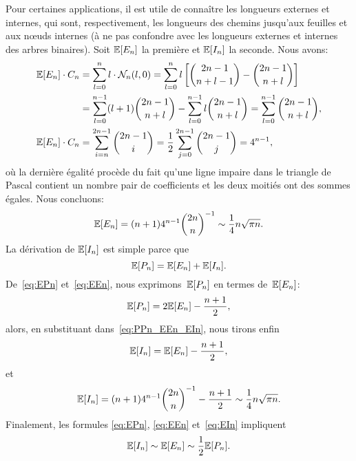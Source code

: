 Pour certaines applications, il est utile de connaître les longueurs
externes et internes, qui sont, respectivement, les longueurs des
chemins jusqu'aux feuilles et aux n{\oe}uds internes (à ne pas
confondre avec les longueurs externes et internes des arbres
binaires). Soit \(\mathbb{E}[{E_n}]\) la première et \(\mathbb{E}[{I_n}]\)
la seconde. Nous avons:
\begin{align*}
\mathbb{E}[{E_n}] \cdot C_n
  &= \sum_{l=0}^{n} l \cdot \mathcal{N}_n(l,0)
   = \sum_{l=0}^{n}l\left[\binom{2n-1}{n+l-1} -
     \binom{2n-1}{n+l}\right]\\
  &= \sum_{l=0}^{n-1}(l+1)\binom{2n-1}{n+l} -
     \sum_{l=0}^{n-1}l \binom{2n-1}{n+l}
   = \sum_{l=0}^{n-1}\binom{2n-1}{n+l},\\
\mathbb{E}[{E_n}] \cdot C_n
  &= \sum_{i=n}^{2n-1}\binom{2n-1}{i}
   = \frac{1}{2}\sum_{j=0}^{2n-1}\binom{2n-1}{j} = 4^{n-1},
\end{align*}
où la dernière égalité procède du fait qu'une ligne impaire dans le
triangle de Pascal contient un nombre pair de coefficients et les deux
moitiés ont des sommes égales. Nous concluons:
\begin{equation}
\mathbb{E}[{E_n}] = (n+1) 4^{n-1}\binom{2n}{n}^{-1} \sim
\frac{1}{4}n\sqrt{\pi n}.
\label{eq:EEn}
\end{equation}
La dérivation de \(\mathbb{E}[{I_n}]\) est simple parce que
\begin{equation}
\mathbb{E}[{P_n}] = \mathbb{E}[{E_n}] + \mathbb{E}[{I_n}].
\label{eq:PPn_EEn_EIn}
\end{equation}
De~\eqref{eq:EPn} et~\eqref{eq:EEn}, nous exprimons~\(\mathbb{E}[{P_n}]\)
en termes de~\(\mathbb{E}[{E_n}]\):
\begin{equation*}
\mathbb{E}[{P_n}] = 2 \mathbb{E}[{E_n}] - \frac{n+1}{2},
\end{equation*}
alors, en substituant dans~\eqref{eq:PPn_EEn_EIn}, nous tirons enfin
\begin{equation*}
\mathbb{E}[{I_n}] = \mathbb{E}[{E_n}] - \frac{n+1}{2},
\end{equation*}
et
\begin{equation}
\mathbb{E}[{I_n}]
  = (n+1)4^{n-1}\binom{2n}{n}^{-1} - \frac{n+1}{2} \sim
  \frac{1}{4}n\sqrt{\pi n}.
\label{eq:EIn}
\end{equation}
Finalement, les formules \eqref{eq:EPn}, \eqref{eq:EEn}
et~\eqref{eq:EIn} impliquent
\begin{equation*}
\mathbb{E}[{I_n}] \sim \mathbb{E}[{E_n}] \sim \frac{1}{2}\mathbb{E}[{P_n}].
\end{equation*}

